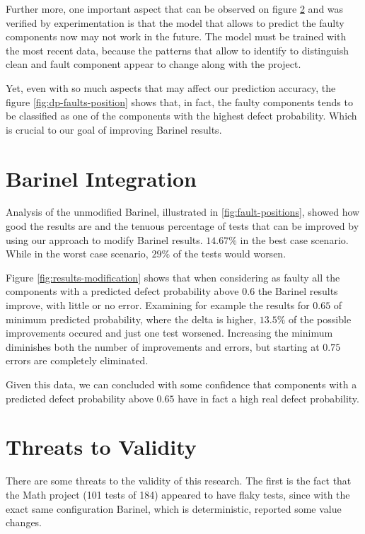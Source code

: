 Further more, one important aspect that can be observed on figure \ref{} and was verified by experimentation is that the model that allows to predict the faulty components now may not work in the future. The model must be trained with the most recent data, because the patterns that allow to identify to distinguish clean and fault component appear to change along with the project.

Yet, even with so much aspects that may affect our prediction accuracy, the figure \ref{fig:dp-faults-position} shows that, in fact, the faulty components tends to be classified as one of the components with the highest defect probability. Which is crucial to our goal of improving Barinel results.

\section{Barinel Integration}

Analysis of the unmodified Barinel, illustrated in \ref{fig:fault-positions}, showed how good the results are and the tenuous percentage of tests that can be improved by using our approach to modify Barinel results. $14.67\%$ in the best case scenario. While in the worst case scenario, $29\%$ of the tests would worsen.

Figure \ref{fig:results-modification} shows that when considering as faulty all the components with a predicted defect probability above $0.6$ the Barinel results improve, with little or no error. Examining for example the results for $0.65$ of minimum predicted probability, where the delta is higher, $13.5\%$ of the possible improvements occured and just one test worsened. Increasing the minimum diminishes both the number of improvements and errors, but starting at $0.75$ errors are completely eliminated.

Given this data, we can concluded with some confidence that components with a predicted defect probability above $0.65$ have in fact a high real defect probability.


\section{Threats to Validity}

There are some threats to the validity of this research. The first is the fact that the Math project (101 tests of 184) appeared to have flaky tests, since with the exact same configuration Barinel, which is deterministic, reported some value changes. 

